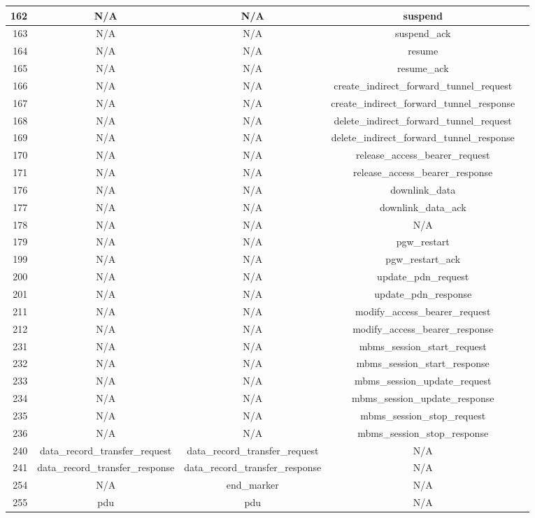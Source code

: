 \documentclass[english]{report}
\begin{document}
\begin{itemize}
\begin{longtable}{|r|c|c|c|p{13.5cm}|}
\hline
162 & N/A & N/A & suspend \\
\hline
163 & N/A & N/A & suspend\_ack \\
\hline
164 & N/A & N/A & resume \\
\hline
165 & N/A & N/A & resume\_ack \\
\hline
166 & N/A & N/A & create\_indirect\_forward\_tunnel\_request \\
\hline
167 & N/A & N/A & create\_indirect\_forward\_tunnel\_response \\
\hline
168 & N/A & N/A & delete\_indirect\_forward\_tunnel\_request \\
\hline
169 & N/A & N/A & delete\_indirect\_forward\_tunnel\_response \\
\hline
170 & N/A & N/A & release\_access\_bearer\_request \\
\hline
171 & N/A & N/A & release\_access\_bearer\_response \\
\hline
176 & N/A & N/A & downlink\_data \\
\hline
177 & N/A & N/A & downlink\_data\_ack \\
\hline
178 & N/A & N/A & N/A \\
\hline
179 & N/A & N/A & pgw\_restart \\
\hline
199 & N/A & N/A & pgw\_restart\_ack \\
\hline
200 & N/A & N/A & update\_pdn\_request \\
\hline
201 & N/A & N/A & update\_pdn\_response \\
\hline
211 & N/A & N/A & modify\_access\_bearer\_request \\
\hline
212 & N/A & N/A & modify\_access\_bearer\_response \\
\hline
231 & N/A & N/A & mbms\_session\_start\_request \\
\hline
232 & N/A & N/A & mbms\_session\_start\_response \\
\hline
233 & N/A & N/A & mbms\_session\_update\_request \\
\hline
234 & N/A & N/A & mbms\_session\_update\_response \\
\hline
235 & N/A & N/A & mbms\_session\_stop\_request \\
\hline
236 & N/A & N/A & mbms\_session\_stop\_response \\
\hline
240 & data\_record\_transfer\_request & data\_record\_transfer\_request & N/A \\
\hline
241 & data\_record\_transfer\_response & data\_record\_transfer\_response & N/A \\
\hline
254 & N/A & end\_marker & N/A \\
\hline
255 & pdu & pdu & N/A \\
\hline
\end{longtable}
\end{itemize}
\end{document}

